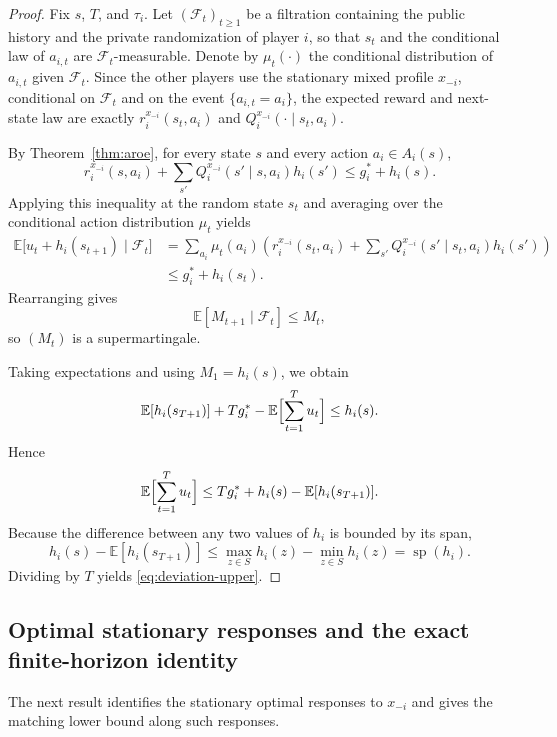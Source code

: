 \documentclass[11pt]{article}
\theoremstyle{definition}
\newcommand{\E}{\mathbb{E}}
\newcommand{\1}{\mathbf{1}}
\DeclareMathOperator{\spn}{sp}
\begin{document}
\begin{proof}
Fix $s$, $T$, and $\tau_i$. Let $(\mathcal F_t)_{t\ge1}$ be a filtration containing the public history and the private randomization of player $i$, so that $s_t$ and the conditional law of $a_{i,t}$ are $\mathcal F_t$-measurable. Denote by $\mu_t(\cdot)$ the conditional distribution of $a_{i,t}$ given $\mathcal F_t$. Since the other players use the stationary mixed profile $x_{-i}$, conditional on $\mathcal F_t$ and on the event $\{a_{i,t}=a_i\}$, the expected reward and next-state law are exactly $r_i^{x_{-i}}(s_t,a_i)$ and $Q_i^{x_{-i}}(\cdot\mid s_t,a_i)$.

By Theorem~\ref{thm:aroe}, for every state $s$ and every action $a_i\in A_i(s)$,
\[
r_i^{x_{-i}}(s,a_i)+\sum_{s'}Q_i^{x_{-i}}(s'\mid s,a_i)h_i(s')\le g_i^*+h_i(s).
\]
Applying this inequality at the random state $s_t$ and averaging over the conditional action distribution $\mu_t$ yields
\begin{align*}
\E\bigl[u_t+h_i(s_{t+1})\mid\mathcal F_t\bigr]
&=\sum_{a_i}\mu_t(a_i)\left(r_i^{x_{-i}}(s_t,a_i)+\sum_{s'}Q_i^{x_{-i}}(s'\mid s_t,a_i)h_i(s')\right)\\
&\le g_i^*+h_i(s_t).
\end{align*}
Rearranging gives
\[
\E[M_{t+1}\mid \mathcal F_t]\le M_t,
\]
so $(M_t)$ is a supermartingale.

Taking expectations and using $M_1=h_i(s)$, we obtain
\[
\E[h_i(s_{T+1})]+Tg_i^*-\E\Bigl[\sum_{t=1}^{T}u_t\Bigr]\le h_i(s).
\]
Hence
\[
\E\Bigl[\sum_{t=1}^{T}u_t\Bigr]\le Tg_i^*+h_i(s)-\E[h_i(s_{T+1})].
\]
Because the difference between any two values of $h_i$ is bounded by its span,
\[
h_i(s)-\E[h_i(s_{T+1})]\le \max_{z\in S}h_i(z)-\min_{z\in S}h_i(z)=\spn(h_i).
\]
Dividing by $T$ yields \eqref{eq:deviation-upper}.
\end{proof}

\subsection{Optimal stationary responses and the exact finite-horizon identity}

The next result identifies the stationary optimal responses to $x_{-i}$ and gives the matching lower bound along such responses.
\end{document}
